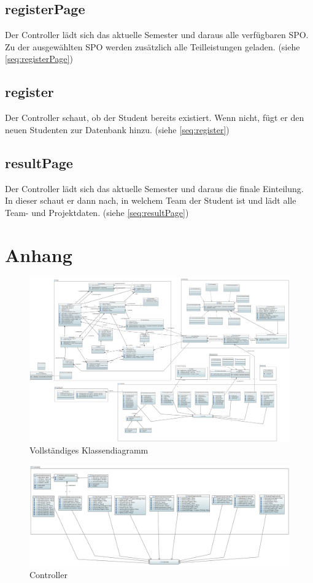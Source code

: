\documentclass[parskip=full]{scrartcl}
\begin{document}
\subsection{registerPage}
Der Controller lädt sich das aktuelle Semester und daraus alle verfügbaren SPO. Zu der ausgewählten SPO werden zusätzlich alle Teilleistungen geladen.
(siehe \autoref{seq:registerPage})
\subsection{register}
Der Controller schaut, ob der Student bereits existiert. Wenn nicht, fügt er den neuen Studenten zur Datenbank hinzu.
(siehe \autoref{seq:register})
\subsection{resultPage}
Der Controller lädt sich das aktuelle Semester und daraus die finale Einteilung. In dieser schaut er dann nach, in welchem Team der Student ist und lädt alle Team- und Projektdaten.
(siehe \autoref{seq:resultPage})




 
\section{Anhang}

\begin{figure}
\centering
\includegraphics[width=\linewidth]{bilder/Class_Diagram.PNG}
\caption{Vollständiges Klassendiagramm}
\label{uml:classDiagram}
\end{figure}

\begin{figure}
\centering
\includegraphics[width=\linewidth]{bilder/controller.png}
\caption{Controller}
\label{uml:controller}
\end{figure}
\end{document}

